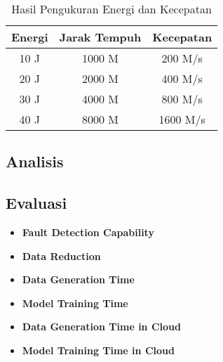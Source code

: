 \begin{longtable}{|c|c|c|}
  \caption{Hasil Pengukuran Energi dan Kecepatan}
  \label{tb:EnergiKecepatan}                                   \\
  \hline
  \rowcolor[HTML]{C0C0C0}
  \textbf{Energi} & \textbf{Jarak Tempuh} & \textbf{Kecepatan} \\
  \hline
  10 J            & 1000 M                & 200 M/s            \\
  20 J            & 2000 M                & 400 M/s            \\
  30 J            & 4000 M                & 800 M/s            \\
  40 J            & 8000 M                & 1600 M/s           \\
  \hline
\end{longtable}

\lipsum[2]

\subsection{Analisis}
\label{subsec:analisis}

\lipsum[3]

\subsection{Evaluasi}
\label{subsec:evaluasi}

\lipsum[4]

\begin{itemize}
  \item \textbf{Fault Detection Capability} \\
        \lipsum[5]
  \item \textbf{Data Reduction} \\
        \lipsum[6]
  \item \textbf{Data Generation Time} \\
        \lipsum[7]
  \item \textbf{Model Training Time} \\
        \lipsum[8]
  \item \textbf{Data Generation Time in Cloud} \\
        \lipsum[9]
  \item \textbf{Model Training Time in Cloud} \\
        \lipsum[10]
\end{itemize}
